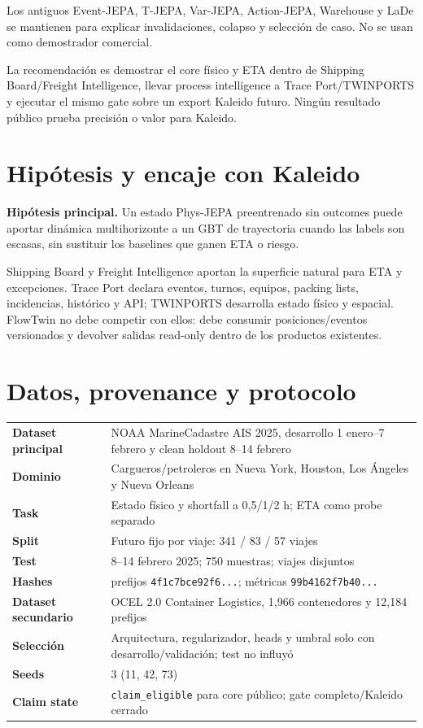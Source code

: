 \documentclass[11pt,a4paper]{article}
\begin{document}
Los antiguos Event-JEPA, T-JEPA, Var-JEPA, Action-JEPA, Warehouse y LaDe se mantienen para explicar invalidaciones, colapso y selección de caso. No se usan como demostrador comercial.

La recomendación es demostrar el core físico y ETA dentro de Shipping Board/Freight Intelligence, llevar process intelligence a Trace Port/TWINPORTS y ejecutar el mismo gate sobre un export Kaleido futuro. Ningún resultado público prueba precisión o valor para Kaleido.

\section{Hipótesis y encaje con Kaleido}
\textbf{Hipótesis principal.} Un estado Phys-JEPA preentrenado sin outcomes puede aportar dinámica multihorizonte a un GBT de trayectoria cuando las labels son escasas, sin sustituir los baselines que ganen ETA o riesgo.

Shipping Board y Freight Intelligence aportan la superficie natural para ETA y excepciones. Trace Port declara eventos, turnos, equipos, packing lists, incidencias, histórico y API; TWINPORTS desarrolla estado físico y espacial. FlowTwin no debe competir con ellos: debe consumir posiciones/eventos versionados y devolver salidas read-only dentro de los productos existentes.

\section{Datos, provenance y protocolo}
\noindent\begin{tabularx}{\linewidth}{@{}>{\bfseries}p{2.6cm}X@{}}\toprule
Dataset principal & NOAA MarineCadastre AIS 2025, desarrollo 1 enero--7 febrero y clean holdout 8--14 febrero \\
Dominio & Cargueros/petroleros en Nueva York, Houston, Los Ángeles y Nueva Orleans \\
Task & Estado físico y shortfall a 0,5/1/2 h; ETA como probe separado \\
Split & Futuro fijo por viaje: 341 / 83 / 57 viajes \\
Test & 8--14 febrero 2025; 750 muestras; viajes disjuntos \\
Hashes & prefijos \texttt{4f1c7bce92f6...}; métricas \texttt{99b4162f7b40...} \\
Dataset secundario & OCEL 2.0 Container Logistics, 1,966 contenedores y 12,184 prefijos \\
Selección & Arquitectura, regularizador, heads y umbral solo con desarrollo/validación; test no influyó \\
Seeds & 3 (11, 42, 73) \\
Claim state & \texttt{claim\_eligible} para core público; gate completo/Kaleido cerrado \\
\bottomrule\end{tabularx}
\end{document}
